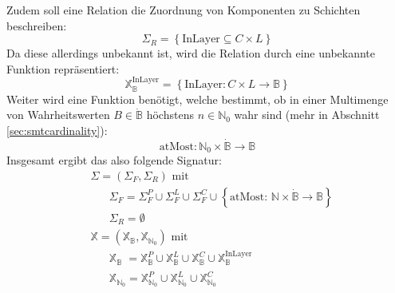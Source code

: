 Zudem soll eine Relation die Zuordnung von Komponenten zu Schichten beschreiben:
\[
    \Sigma_{R} = \left\{ \text{InLayer} \subseteq C \times L \right\}
\]
Da diese allerdings unbekannt ist, wird die Relation durch eine unbekannte Funktion repräsentiert:
\[
    \mathbb{X}_{\mathbb{B}}^{\text{InLayer}} = \left\{ \text{InLayer}: C \times L \rightarrow \mathbb{B} \right\}
\]
Weiter wird eine Funktion benötigt, welche bestimmt, ob in einer Multimenge von Wahrheitswerten $B \in \dot{\mathbb{B}}$ höchstens $n \in \mathbb{N}_0$ wahr sind (mehr in Abschnitt \ref{sec:smtcardinality}):
\[
    \text{atMost}: \mathbb{N}_0 \times \dot{\mathbb{B}} \rightarrow \mathbb{B}
\]
Insgesamt ergibt das also folgende Signatur:
\begin{align*}
    &\hspace{0pt} \Sigma = \left( \Sigma_F, \Sigma_R \right) \text{ mit } \\
    &\hspace{20pt} \Sigma_F = \Sigma_{F}^{P} \cup \Sigma_{F}^{L} \cup \Sigma_{F}^{C} \cup \left\{ \text{atMost: } \mathbb{N} \times \dot{\mathbb{B}} \rightarrow \mathbb{B} \right\}\\
    &\hspace{20pt} \Sigma_R = \emptyset \\
    &\hspace{0pt} \mathbb{X} = (\mathbb{X}_{\mathbb{B}}, \mathbb{X}_{\mathbb{N}_0}) \text{ mit} \\
    &\hspace{20pt} \mathbb{X}_{\mathbb{B}_{\phantom{0}}} = \mathbb{X}^{P}_{\mathbb{B}} \cup \mathbb{X}^{L}_{\mathbb{B}} \cup \mathbb{X}^{C}_{\mathbb{B}} \cup \mathbb{X}^{\text{InLayer}}_{\mathbb{B}} \\
    &\hspace{20pt} \mathbb{X}_{\mathbb{N}_0} = \mathbb{X}^{P}_{\mathbb{N}_0} \cup \mathbb{X}^{L}_{\mathbb{N}_0} \cup \mathbb{X}^{C}_{\mathbb{N}_0}
\end{align*}

